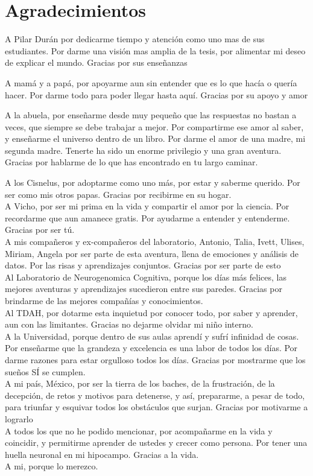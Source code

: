 \documentclass[12pt,letterpaper,final]{article}
\renewenvironment{acknowledgements}
{\newpage\section*{Agradecimientos}\begin{singlespace}\normalsize}
	{\end{singlespace}\par\newpage}
\begin{document}
\begin{acknowledgements}
A Pilar Durán por dedicarme tiempo y atención como uno mas de sus estudiantes. Por darme una visión mas amplia de la tesis, por alimentar mi deseo de explicar el mundo. Gracias por sus enseñanzas

A mamá y a papá, por apoyarme aun sin entender que es lo que hacía o quería hacer. Por darme todo para poder llegar hasta aquí. Gracias por su apoyo y amor

A la abuela, por enseñarme desde muy pequeño que las respuestas no bastan a veces, que siempre se debe trabajar a mejor. Por compartirme ese amor al saber, y enseñarme el universo dentro de un libro. Por darme el amor de una madre, mi segunda madre. Tenerte ha sido un enorme privilegio y una gran aventura.  Gracias por hablarme de lo que has encontrado en tu largo caminar.

A los Cisnelus, por adoptarme como uno más, por estar y saberme querido. Por ser como mis otros papas. Gracias por recibirme en su hogar.\\

A Vicho, por ser mi prima en la vida y compartir el amor por la ciencia. Por recordarme que aun amanece gratis.
Por ayudarme a entender y entenderme. Gracias por ser tú. \\

A mis compañeros y ex-compañeros del laboratorio, Antonio, Talia, Ivett, Ulises, Miriam, Angela por ser parte de esta aventura, llena de emociones y análisis de datos. Por las risas y aprendizajes conjuntos.  Gracias por ser parte de esto\\

Al Laboratorio de Neurogenomica Cognitiva, porque los días más felices, las mejores aventuras y aprendizajes sucedieron entre sus paredes. Gracias por brindarme de las mejores compañías y conocimientos. \\

Al TDAH, por dotarme esta inquietud por conocer todo, por saber y aprender, aun con las limitantes. Gracias no dejarme olvidar mi niño interno.\\

A la Universidad, porque dentro de sus aulas aprendí y sufrí infinidad de cosas. Por enseñarme que la grandeza y excelencia es una labor de todos los días. Por darme razones para estar orgulloso todos los días.
Gracias por mostrarme que los sueños SÍ se cumplen. \\

A mi país, México, por ser la tierra de los baches, de la frustración, de la decepción, de retos y motivos para detenerse, y así, prepararme, a pesar de todo, para triunfar y  esquivar todos los obstáculos que surjan. Gracias por motivarme a lograrlo \\


A todos los que no he podido mencionar, por acompañarme en la vida y coincidir, y permitirme aprender de ustedes y crecer como persona. Por tener una huella neuronal en mi hipocampo. Gracias a la vida.\\


A mi, porque lo merezco. 

\end{acknowledgements}
\end{document}
